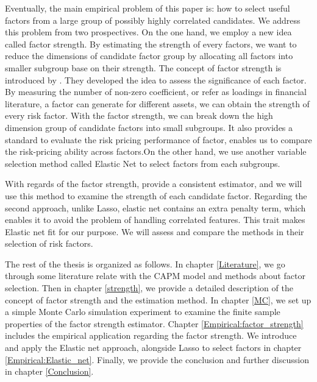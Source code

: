 Eventually, the main empirical problem of this paper is: how to select useful factors from a large group of possibly highly correlated candidates.
We address this problem from two prospectives.
On the one hand, we employ a new idea called factor strength.
By estimating the strength of every factors, we want to reduce the dimensions of candidate factor group by allocating all factors into smaller subgroup base on their strength.
The concept of factor strength is introduced by .
They developed the idea to assess the significance of each factor.
By measuring the number of non-zero coefficient, or refer as loadings in financial literature, a factor can generate for different assets, we can obtain the strength of every risk factor.
With the factor strength, we can break down the high dimension group of candidate factors into small subgroups.
It also provides a standard to evaluate the risk pricing performance of factor, enables us to compare the risk-pricing ability across factors.On the other hand, we use another variable selection method called Elastic Net \cite{Zou2005} to select factors from each subgroups.

With regards of the factor strength,  provide a consistent estimator, and we will use this method to examine the strength of each candidate factor.
Regarding the second approach, unlike Lasso, elastic net contains an extra penalty term, which enables it to avoid the problem of handling correlated features.
This trait makes Elastic net fit for our purpose.
We will assess and compare the methods in their selection of risk factors.

The rest of the thesis is organized as follows.
In chapter \ref{Literature}, we go through some literature relate with the CAPM model and methods about factor selection.
Then in chapter \ref{strength}, we provide a detailed description of the concept of factor strength and the estimation method.
In chapter \ref{MC}, we set up a simple Monte Carlo simulation experiment to examine the finite sample properties of the factor strength estimator.
Chapter \ref{Empirical:factor_strength} includes the empirical application regarding the factor strength.
We introduce and apply the Elastic net approach, alongside Lasso to select factors in chapter \ref{Empirical:Elastic_net}.
Finally, we provide the conclusion and further discussion in chapter \ref{Conclusion}.


